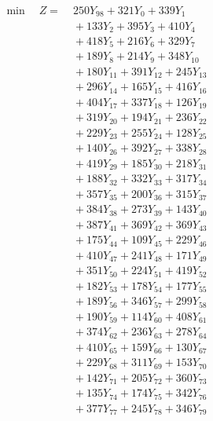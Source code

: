 \documentclass[a4paper,10pt]{article}
\begin{document}
\allowdisplaybreaks
{\small
\begin{align}
\min \quad Z = &\; 250 Y_{98} + 321 Y_{0} + 339 Y_{1} \\[0.3ex]
&\;  + 133 Y_{2} + 395 Y_{3} + 410 Y_{4} \\[0.3ex]
&\;  + 418 Y_{5} + 216 Y_{6} + 329 Y_{7} \\[0.3ex]
&\;  + 189 Y_{8} + 214 Y_{9} + 348 Y_{10} \\[0.3ex]
&\;  + 180 Y_{11} + 391 Y_{12} + 245 Y_{13} \\[0.3ex]
&\;  + 296 Y_{14} + 165 Y_{15} + 416 Y_{16} \\[0.3ex]
&\;  + 404 Y_{17} + 337 Y_{18} + 126 Y_{19} \\[0.3ex]
&\;  + 319 Y_{20} + 194 Y_{21} + 236 Y_{22} \\[0.3ex]
&\;  + 229 Y_{23} + 255 Y_{24} + 128 Y_{25} \\[0.3ex]
&\;  + 140 Y_{26} + 392 Y_{27} + 338 Y_{28} \\[0.5ex]\allowbreak
&\;  + 419 Y_{29} + 185 Y_{30} + 218 Y_{31} \\[0.3ex]
&\;  + 188 Y_{32} + 332 Y_{33} + 317 Y_{34} \\[0.3ex]
&\;  + 357 Y_{35} + 200 Y_{36} + 315 Y_{37} \\[0.3ex]
&\;  + 384 Y_{38} + 273 Y_{39} + 143 Y_{40} \\[0.3ex]
&\;  + 387 Y_{41} + 369 Y_{42} + 369 Y_{43} \\[0.3ex]
&\;  + 175 Y_{44} + 109 Y_{45} + 229 Y_{46} \\[0.3ex]
&\;  + 410 Y_{47} + 241 Y_{48} + 171 Y_{49} \\[0.3ex]
&\;  + 351 Y_{50} + 224 Y_{51} + 419 Y_{52} \\[0.3ex]
&\;  + 182 Y_{53} + 178 Y_{54} + 177 Y_{55} \\[0.3ex]
&\;  + 189 Y_{56} + 346 Y_{57} + 299 Y_{58} \\[0.5ex]\allowbreak
&\;  + 190 Y_{59} + 114 Y_{60} + 408 Y_{61} \\[0.3ex]
&\;  + 374 Y_{62} + 236 Y_{63} + 278 Y_{64} \\[0.3ex]
&\;  + 410 Y_{65} + 159 Y_{66} + 130 Y_{67} \\[0.3ex]
&\;  + 229 Y_{68} + 311 Y_{69} + 153 Y_{70} \\[0.3ex]
&\;  + 142 Y_{71} + 205 Y_{72} + 360 Y_{73} \\[0.3ex]
&\;  + 135 Y_{74} + 174 Y_{75} + 342 Y_{76} \\[0.3ex]
&\;  + 377 Y_{77} + 245 Y_{78} + 346 Y_{79} \\[0.3ex]

\end{align}}
\end{document}
